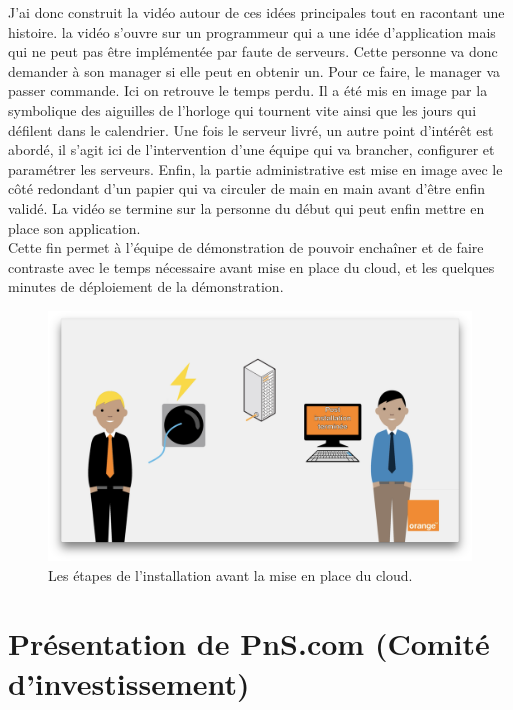 J'ai donc construit la vidéo autour de ces idées principales tout en racontant une histoire. la vidéo s'ouvre sur un programmeur qui a une idée d'application mais qui ne peut pas être implémentée par faute de serveurs. Cette personne va donc demander à son manager si elle peut en obtenir un. Pour ce faire, le manager va passer commande. Ici on retrouve le temps perdu. Il a été mis en image par la symbolique des aiguilles de l'horloge qui tournent vite ainsi que les jours qui défilent dans le calendrier. Une fois le serveur livré, un autre point d'intérêt est abordé, il s'agit ici de l'intervention d'une équipe qui va brancher, configurer et paramétrer les serveurs. Enfin, la partie administrative est mise en image avec le côté redondant d'un papier qui va circuler de main en main avant d'être enfin validé. La vidéo se termine sur la personne du début qui peut enfin mettre en place son application.\\

Cette fin permet à l'équipe de démonstration de pouvoir enchaîner et de faire contraste avec le temps nécessaire avant mise en place du cloud, et les quelques minutes de déploiement de la démonstration.

\begin{figure}[htp]
  \centering
  \includegraphics[width=15cm]{images/cd/cd.png}
  \caption{Les étapes de l'installation avant la mise en place du cloud.}
  \label{comite}
\end{figure}



\section{Présentation de PnS.com (Comité d'investissement)}
